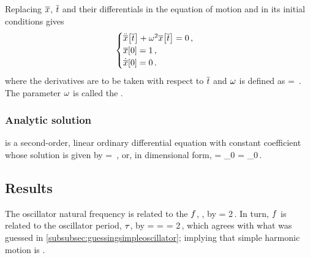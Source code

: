 Replacing $\overline{x}$, $\overline{t}$ and their differentials in the equation of motion and in its initial conditions gives
\begin{equation}\label{eq:dimlessequationmotionsimpleoscillator}
\begin{cases}
\ddot{\overline{x}}\!\left[{\overline{t}}\right] + \omega^2\overline{x}\!\left[{\overline{t}}\right] = 0\,, \\
\overline{x}\!\left[{0}\right] = 1\,,\\
\dot{\overline{x}}\!\left[{0}\right] = 0\,.
\end{cases}
\end{equation}
where the derivatives are to be taken with respect to $\overline{t}$ and $\omega$ is defined as
\beq
\natfreq = \sqrt{\dfrac{\kspring}{\mass}}\,.
\eeq
The parameter $\omega$ is called the .


\subsubsection{Analytic solution}
 is a second-order, linear ordinary differential equation with constant coefficient whose solution is given by
\beq
\scpq\odisp = \cos{}\,,
\eeq
or, in dimensional form,
\beq
\odisp = \odisp_0\cos{}
       = \odisp_0\cos{}\,.
\eeq


\subsection{Results}
The oscillator natural frequency is related to the  $f$, , by
\beq
\natfreq = 2\pi\cycfreq\,.
\eeq
In turn, $f$ is related to the oscillator period, $\tau$, by
\beq
\oper =  
      = \dfrac{2\pi}{\natfreq} 
      = 2\pi\sqrt{\dfrac{\mass}{\kspring}}\,,
\eeq
which agrees with what was guessed in \cref{subsubsec:guessingsimpleoscillator}; implying that simple harmonic motion is .
